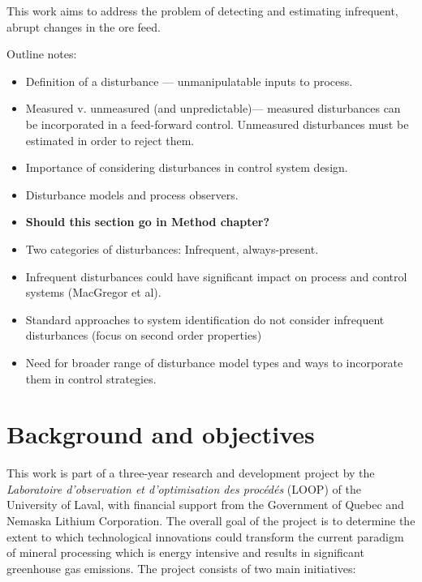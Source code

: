 
This work aims to address the problem of detecting and estimating infrequent, abrupt changes in the ore feed.

Outline notes:

\begin{itemize}
	\item Definition of a disturbance — unmanipulatable inputs to process.
	\item Measured v. unmeasured (and unpredictable)— measured disturbances can be incorporated in a feed-forward control.  Unmeasured disturbances must be estimated in order to reject them.
	\item Importance of considering disturbances in control system design.
	\item Disturbance models and process observers.
	\item \textbf{Should this section go in Method chapter?}
	\item Two categories of disturbances: Infrequent, always-present.
	\item Infrequent disturbances could have significant impact on process and control systems (MacGregor et al).
	\item Standard approaches to system identification do not consider infrequent disturbances (focus on second order properties)
	\item Need for broader range of disturbance model types and ways to incorporate them in control strategies.
\end{itemize}

\section*{Background and objectives}

This work is part of a three-year research and development project by the \textit{Laboratoire d’observation et d’optimisation des procédés} (LOOP) of the University of Laval, with financial support from the Government of Quebec and Nemaska Lithium Corporation. The overall goal of the project is to determine the extent to which technological innovations could transform the current paradigm of mineral processing which is energy intensive and results in significant greenhouse gas emissions. The project consists of two main initiatives:

